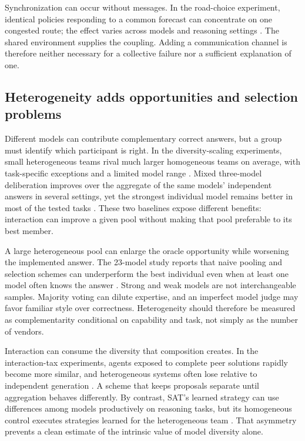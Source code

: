 Synchronization can occur without messages. In the road-choice experiment, identical policies responding to a common forecast can concentrate on one congested route; the effect varies across models and reasoning settings \citep{tokyo-road-game}. The shared environment supplies the coupling. Adding a communication channel is therefore neither necessary for a collective failure nor a sufficient explanation of one.

\subsection{Heterogeneity adds opportunities and selection problems}
Different models can contribute complementary correct answers, but a group must identify which participant is right. In the diversity-scaling experiments, small heterogeneous teams rival much larger homogeneous teams on average, with task-specific exceptions and a limited model range \citep{diversity-scaling}. Mixed three-model deliberation improves over the aggregate of the same models' independent answers in several settings, yet the strongest individual model remains better in most of the tested tasks \citep{deliberative-crowds}. These two baselines expose different benefits: interaction can improve a given pool without making that pool preferable to its best member.

A large heterogeneous pool can enlarge the oracle opportunity while worsening the implemented answer. The 23-model study reports that naive pooling and selection schemes can underperform the best individual even when at least one model often knows the answer \citep{mo-models-mo-problems}. Strong and weak models are not interchangeable samples. Majority voting can dilute expertise, and an imperfect model judge may favor familiar style over correctness. Heterogeneity should therefore be measured as complementarity conditional on capability and task, not simply as the number of vendors.

Interaction can consume the diversity that composition creates. In the interaction-tax experiments, agents exposed to complete peer solutions rapidly become more similar, and heterogeneous systems often lose relative to independent generation \citep{interaction-tax}. A scheme that keeps proposals separate until aggregation behaves differently. By contrast, SAT's learned strategy can use differences among models productively on reasoning tasks, but its homogeneous control executes strategies learned for the heterogeneous team \citep{sat-teams}. That asymmetry prevents a clean estimate of the intrinsic value of model diversity alone.

